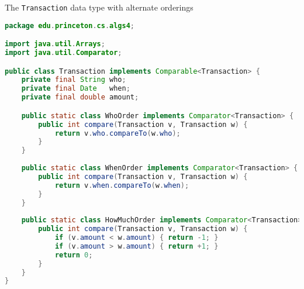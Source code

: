 \documentclass[8pt,a4paper,compress]{beamer}
\begin{document}
\begin{frame}[fragile]
\pause

The \lstinline{Transaction} data type with alternate orderings
\begin{lstlisting}[language=Java]
package edu.princeton.cs.algs4;

import java.util.Arrays;
import java.util.Comparator;

public class Transaction implements Comparable<Transaction> {  
    private final String who;
    private final Date   when; 
    private final double amount;

    public static class WhoOrder implements Comparator<Transaction> {
        public int compare(Transaction v, Transaction w) { 
            return v.who.compareTo(w.who); 
        }        
    }
    
    public static class WhenOrder implements Comparator<Transaction> {
        public int compare(Transaction v, Transaction w) { 
            return v.when.compareTo(w.when); 
        }
    }
    
    public static class HowMuchOrder implements Comparator<Transaction> {
        public int compare(Transaction v, Transaction w) {
            if (v.amount < w.amount) { return -1; }
            if (v.amount > w.amount) { return +1; }
            return 0;
        }
    }
}
\end{lstlisting}
\end{frame}
\end{document}
